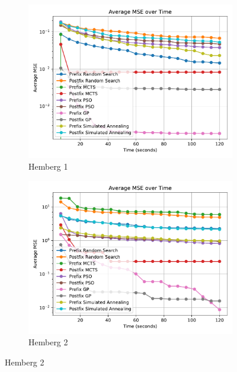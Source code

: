 \documentclass[runningheads]{llncs}
\begin{document}
\begin{figure}
    \centering
    
    \begin{subfigure}[b]{0.4\textwidth}
        \includegraphics[width=\linewidth, keepaspectratio]{Hemberg_Benchmarks/Hemberg_Benchmark_1.pdf}
        \caption{Hemberg 1}
        \label{subfig:hemberg_1}
    \end{subfigure}
    \begin{subfigure}[b]{0.4\textwidth}
        \includegraphics[width=\linewidth, keepaspectratio]{Hemberg_Benchmarks/Hemberg_Benchmark_2.pdf}
        \caption{Hemberg 2}
        \label{subfig:hemberg_2}
    \end{subfigure}
    

\end{figure}
\end{document}
